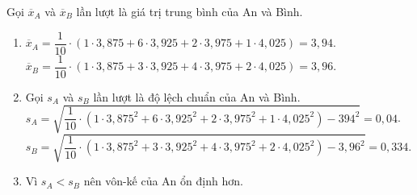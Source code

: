 \begin{vd}[Mức độ 3]
{		Gọi $ \overline{x}_{A} $ và $ \overline{x}_{B} $ lần lượt là giá trị trung bình của An và Bình.
		\begin{enumerate}
			\item $ \overline{x}_{A}=\dfrac{1}{10}\cdot(1\cdot 3{,}875+6\cdot3{,}925+2\cdot 3{,}975+1\cdot 4{,}025)=3{,}94 $.\\
			$ \overline{x}_{B}=\dfrac{1}{10}\cdot(1\cdot 3{,}875+3\cdot3{,}925+4\cdot 3{,}975+2\cdot 4{,}025)=3{,}96 $.
			\item Gọi $ s_{A} $ và $ s_{B} $ lần lượt là độ lệch chuẩn của An và Bình.\\
			$ s_{A}=\sqrt{\dfrac{1}{10}\cdot(1\cdot 3{,}875^{2}+6\cdot 3{,}925^{2}+2\cdot 3{,}975^{2}+1\cdot 4{,}025^{2})-3{}94^{2}}=0{,}04 $.\\
			$ s_{B}=\sqrt{\dfrac{1}{10}\cdot(1\cdot 3{,}875^{2}+3\cdot 3{,}925^{2}+4\cdot 3{,}975^{2}+2\cdot 4{,}025^{2})-3{,}96^{2}}=0{,}334 $.
			\item Vì $s_{A}<s_{B}$ nên vôn-kế của An ổn định hơn.
		\end{enumerate}
	}
\end{vd}

